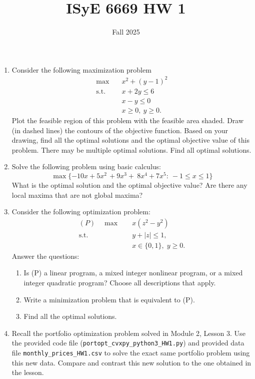 \documentclass{article}
\title{ISyE 6669 HW 1}
\date{Fall 2025}
\begin{document}
\maketitle


\begin{enumerate}
\item Consider the following maximization problem
\begin{align*}
    \max\quad & x^2 + (y-1)^2 \\
\text{s.t.}\quad & x + 2y \le 6 \\
& x - y \le 0 \\
& x \ge 0,\ y \ge 0.
\end{align*}
Plot the feasible region of this problem with the feasible area shaded. Draw (in dashed lines) the contours of the objective function. Based on your 
drawing, find all the optimal solutions and the optimal objective value of this problem. There may be multiple optimal solutions. Find all optimal solutions.


\item Solve the following problem using basic calculus:
$$\max\{ -10x + 5x^{2\ }+9x^{3}+\ 8x^{4}+7x^{5}:  \ -1 \le x \le 1\}$$
What is the optimal solution and the optimal objective value? Are there any local maxima that are not global maxima? 


\item Consider the following optimization problem:
\begin{align*}
    (P)\quad \max \quad & x (z^2 - y^2) \\
    \text{s.t.}\quad & y + |z|\le 1, \\
    & x \in \{0,1\}, \; y\ge 0.
\end{align*}
Answer the questions:
\begin{enumerate}
    \item Is (P) a linear program, a mixed integer nonlinear program, or a mixed integer quadratic program? Choose all descriptions that apply.
    
    \item Write a minimization problem that is equivalent to (P).
    
    \item Find all the optimal solutions.
\end{enumerate}

\item Recall the portfolio optimization problem solved in Module 2, Lesson 3. Use the provided code file (\texttt{portopt\_cvxpy\_python3\_HW1.py}) and provided data file \texttt{monthly\_prices\_HW1.csv} to solve the exact same portfolio problem using this new data. Compare and contrast this new solution to the one obtained in the lesson.

\end{enumerate}
\end{document}
